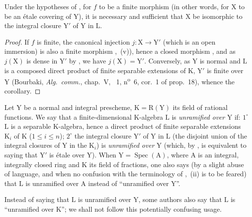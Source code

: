 \begin{corollary}[18.10.9]
\label{IV.18.10.9}
Under the hypotheses of , for $f$ to be a finite morphism (in other words, for $\mathrm{X}$ to be an \'etale covering of $\mathrm{Y}$), it is necessary and sufficient that $\mathrm{X}$ be isomorphic to the integral closure $\mathrm{Y}'$ of $\mathrm{Y}$ in $\mathrm{L}$.
\end{corollary}

\begin{proof}
If $f$ is finite, the canonical injection $j:\mathrm{X}\to\mathrm{Y}'$ (which is an open immersion) is also a finite morphism ,~(v)), hence a closed morphism , and as $j(\mathrm{X})$ is dense in $\mathrm{Y}'$ by , we have $j(\mathrm{X})=\mathrm{Y}'$.
Conversely, as $\mathrm{Y}$ is normal and $\mathrm{L}$ is a composed direct product of finite separable extensions of $\mathrm{K}$, $\mathrm{Y}'$ is finite over $\mathrm{Y}$ (Bourbaki, \emph{Alg.\ comm.}, chap.~V, \textsection~1, n\textsuperscript{o}~6, cor.~1 of prop.~18), whence the corollary.
\end{proof}

\begin{env}[18.10.10]
\label{IV.18.10.10}
Let $\mathrm{Y}$ be a normal and integral prescheme, $\mathrm{K}=\mathrm{R}(\mathrm{Y})$ its field of rational functions.
We say that a finite-dimensional $\mathrm{K}$-algebra $\mathrm{L}$ is \emph{unramified over $\mathrm{Y}$} if: $1^{\circ}$ $\mathrm{L}$ is a separable $\mathrm{K}$-algebra, hence a direct product of finite separable extensions $\mathrm{K}_i$ of $\mathrm{K}$ ($1\leq i\leq n$); $2^{\circ}$ the integral closure $\mathrm{Y}'$ of $\mathrm{Y}$ in $\mathrm{L}$ (the disjoint union of the integral closures of $\mathrm{Y}$ in the $\mathrm{K}_i$) is \emph{unramified over} $\mathrm{Y}$ (which, by ,
is equivalent to saying that $\mathrm{Y}'$ is \'etale over $\mathrm{Y}$).
When $\mathrm{Y}=\operatorname{Spec}(\mathrm{A})$, where $\mathrm{A}$ is an integral, integrally closed ring and $\mathrm{K}$ its field of fractions, one also says (by a slight abuse of language, and when no confusion with the terminology of ,~(ii) is to be feared) that $\mathrm{L}$ is unramified over $\mathrm{A}$ instead of ``unramified over $\mathrm{Y}$''.
\end{env}

\begin{remark}[18.10.11]
\label{IV.18.10.11}
Instead of saying that $\mathrm{L}$ is unramified over $\mathrm{Y}$, some authors also say that $\mathrm{L}$ is ``unramified over $\mathrm{K}$''; we shall not follow this potentially confusing usage.
\end{remark}

